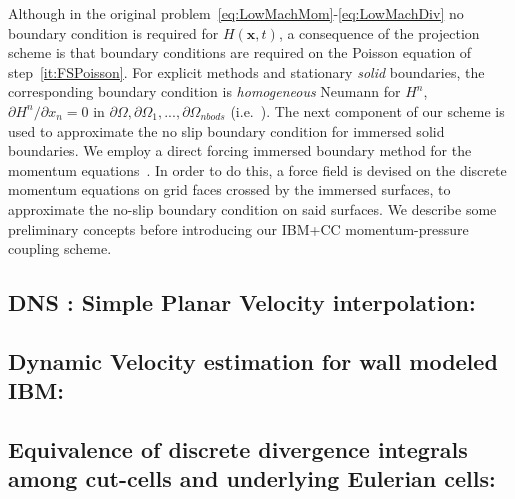 %
Although in the original problem~\eqref{eq:LowMachMom}-\eqref{eq:LowMachDiv} no boundary condition is required for $H(\mathbf{x},t)$, a consequence of the projection scheme is that boundary conditions are required on the Poisson equation of step~\eqref{it:FSPoisson}. For explicit methods and stationary \textit{solid} boundaries, the corresponding boundary condition is \textit{homogeneous} Neumann for $H^n$, $\partial H^n / \partial x_n =0$ in $\partial \Omega,\partial \Omega_1,...,\partial \Omega_{nbods}$ (i.e.~\cite{Perot:1993}).
The next component of our scheme is used to approximate the no slip boundary condition for immersed solid boundaries. We employ a direct forcing immersed boundary method for the momentum equations~\cite{Fadlun:2000}. In order to do this, a force field is devised on the discrete momentum equations on grid faces crossed by the immersed surfaces, to approximate the no-slip boundary condition on said surfaces. We describe some preliminary concepts before introducing our IBM+CC momentum-pressure coupling scheme.

\subsection{DNS : Simple Planar Velocity interpolation:}



\subsection{Dynamic Velocity estimation for wall modeled IBM:}




\subsection{Equivalence of discrete divergence integrals among cut-cells and underlying Eulerian cells:}


